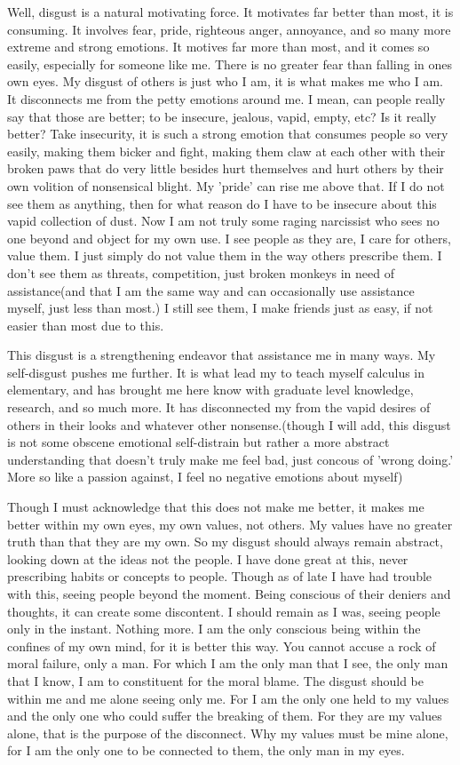 \par Well, disgust is a natural motivating force. It motivates far better than most, it is consuming. It involves fear, pride, righteous anger, annoyance, and so many more extreme and strong emotions. It motives far more than most, and it comes so easily, especially for someone like me. There is no greater fear than falling in ones own eyes. My disgust of others is just who I am, it is what makes me who I am. It disconnects me from the petty emotions around me. I mean, can people really say that those are better; to be insecure, jealous, vapid, empty, etc? Is it really better? Take insecurity, it is such a strong emotion that consumes people so very easily, making them bicker and fight, making them claw at each other with their broken paws that do very little besides hurt themselves and hurt others by their own volition of nonsensical blight. My 'pride' can rise me above that. If I do not see them as anything, then for what reason do I have to be insecure about this vapid collection of dust. Now I am not truly some raging narcissist who sees no one beyond and object for my own use. I see people as they are, I care for others, value them. I just simply do not value them in the way others prescribe them. I don't see them as threats, competition, just broken monkeys in need of assistance(and that I am the same way and can occasionally use assistance myself, just less than most.) I still see them, I make friends just as easy, if not easier than most due to this.
\par This disgust is a strengthening endeavor that assistance me in many ways. My self-disgust pushes me further. It is what lead my to teach myself calculus in elementary, and has brought me here know with graduate level knowledge, research, and so much more. It has disconnected my from the vapid desires of others in their looks and whatever other nonsense.(though I will add, this disgust is not some obscene emotional self-distrain but rather a more abstract understanding that doesn't truly make me feel bad, just concous of 'wrong doing.' More so like a passion against, I feel no negative emotions about myself)
\par Though I must acknowledge that this does not make me better, it makes me better within my own eyes, my own values, not others. My values have no greater truth than that they are my own. So my disgust should always remain abstract, looking down at the ideas not the people. I have done great at this, never prescribing habits or concepts to people. Though as of late I have had trouble with this, seeing people beyond the moment. Being conscious of their deniers and thoughts, it can create some discontent. I should remain as I was, seeing people only in the instant. Nothing more. I am the only conscious being within the confines of my own mind, for it is better this way. You cannot accuse a rock of moral failure, only a man. For which I am the only man that I see, the only man that I know, I am to constituent for the moral blame. The disgust should be within me and me alone seeing only me. For I am the only one held to my values and the only one who could suffer the breaking of them. For they are my values alone, that is the purpose of the disconnect. Why my values must be mine alone, for I am the only one to be connected to them, the only man in my eyes.
